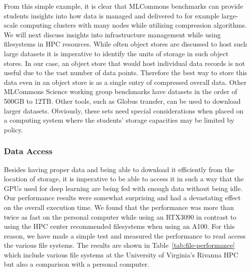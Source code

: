 \documentclass[utf8]{FrontiersinVancouver} %
\begin{document}
From this simple example, it is clear that MLCommons benchmarks can provide students insights into how data is managed and delivered to for example large-scale computing clusters with many nodes while utilizing compression algorithms. We will next discuss insights into infrastructure management while using filesystems in HPC resources.  While often object stores are discussed to host such large datasets it is imperative to identify the units of storage in such object stores.  In our case, an object store that would host individual data records is not useful due to the vast number of data points. Therefore the best way to store this data even in an object store is as a single entry of compressed overall data.  Other MLCommons Science working group benchmarks have datasets in the order of 500GB to 12TB. Other tools, such as Globus transfer, can be used to download larger datasets.  Obviously, these sets need special considerations when placed on a computing system where the students' storage capacities may be limited by policy.


\subsubsection{Data Access}

Besides having proper data and being able to download it efficiently from the location of storage, it is imperative to be able to access it in such a way that the GPUs used for deep learning are being fed with enough data without being idle. Our performance results were somewhat surprising and had a devastating effect on the overall execution time. We found that the performance was more than twice as fast on the personal computer while using an RTX3090 in contrast to using the HPC center recommended filesystems when using an A100. For this reason, we have made a simple test and measured the performance to read access the various file systems. The results are shown in Table~\ref{tab:file-performance} which include various file systems at the University of Virginia's Rivanna HPC but also a comparison with a personal computer.
\end{document}
